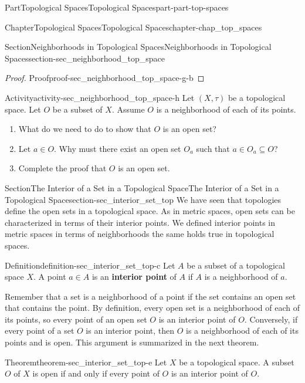 \documentclass[oneside,10pt,]{book}
\newcommand{\terminology}[1]{\textbf{#1}}
\numberwithin{equation}{chapter}
\begin{document}
\begin{partptx}{Part}{Topological Spaces}{}{Topological Spaces}{}{}{part-part-top-spaces}
\begin{chapterptx}{Chapter}{Topological Spaces}{}{Topological Spaces}{}{}{chapter-chap_top_spaces}
\begin{sectionptx}{Section}{Neighborhoods in Topological Spaces}{}{Neighborhoods in Topological Spaces}{}{}{section-sec_neighborhood_top_space}
\begin{proof}{Proof}{}{proof-sec_neighborhood_top_space-g-b}
\end{proof}
\begin{activity}{Activity}{}{activity-sec_neighborhood_top_space-h}%
Let \((X, \tau)\) be a topological space. Let \(O\) be a subset of \(X\). Assume \(O\) is a neighborhood of each of its points.%
\begin{enumerate}[font=\bfseries,label=(\alph*),ref=\alph*]%
\item{}What do we need to do to show that \(O\) is an open set?%
\item{}Let \(a \in O\). Why must there exist an open set \(O_a\) such that \(a \in O_a \subseteq O\)?%
\item{}Complete the proof that \(O\) is an open set.%
\end{enumerate}%
\end{activity}%
\end{sectionptx}
%
%
\typeout{************************************************}
\typeout{************************************************}
%
\begin{sectionptx}{Section}{The Interior of a Set in a Topological Space}{}{The Interior of a Set in a Topological Space}{}{}{section-sec_interior_set_top}
We have seen that topologies define the open sets in a topological space. As in metric spaces, open sets can be characterized in terms of their interior points. We defined interior points in metric spaces in terms of neighborhoods \textemdash{} the same holds true in topological spaces.%
\begin{definition}{Definition}{}{definition-sec_interior_set_top-c}%
%
Let \(A\) be a subset of a topological space \(X\). A point \(a \in A\) is an \terminology{interior point} of \(A\) if \(A\) is a neighborhood of \(a\).%
\end{definition}
Remember that a set is a neighborhood of a point if the set contains an open set that contains the point. By definition, every open set is a neighborhood of each of its points, so every point of an open set \(O\) is an interior point of \(O\). Conversely, if every point of a set \(O\) is an interior point, then \(O\) is a neighborhood of each of its points and is open. This argument is summarized in the next theorem.%
\begin{theorem}{Theorem}{}{}{theorem-sec_interior_set_top-e}%
Let \(X\) be a topological space. A subset \(O\) of \(X\) is open if and only if every point of \(O\) is an interior point of \(O\).%
\end{theorem}

\end{sectionptx}
\end{chapterptx}
\end{partptx}
\end{document}
